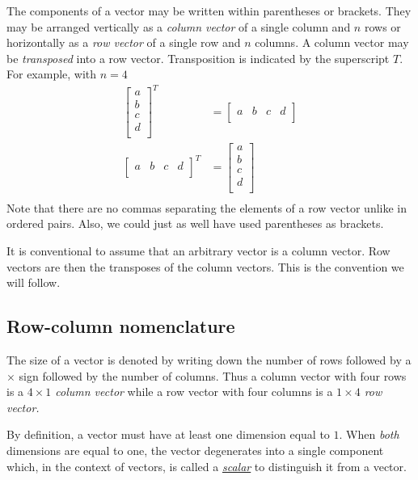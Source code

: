 \documentclass[
  a4paper,
]{article}
\begin{document}
The components of a vector may be written within parentheses or
brackets. They may be arranged vertically as a \emph{column vector} of a
single column and \(n\) rows or horizontally as a \emph{row vector} of a
single row and \(n\) columns. A column vector may be \emph{transposed}
into a row vector. Transposition is indicated by the superscript \(T\).
For example, with \(n = 4\) \[
\begin{aligned}
\begin{bmatrix}a\\b\\c\\d\\\end{bmatrix}^{T} & = \begin{bmatrix}a&b&c&d\\\end{bmatrix}\\
\begin{bmatrix}a&b&c&d\\\end{bmatrix}^{T} & = \begin{bmatrix}a\\b\\c\\d\\\end{bmatrix}\\
\end{aligned}
\] Note that there are no commas separating the elements of a row vector
unlike in ordered pairs. Also, we could just as well have used
parentheses as brackets.

It is conventional to assume that an arbitrary vector is a column
vector. Row vectors are then the transposes of the column vectors. This
is the convention we will follow.

\hypertarget{row-column-nomenclature}{%
\subsection{Row-column nomenclature}\label{row-column-nomenclature}}

The size of a vector is denoted by writing down the number of rows
followed by a \(\times\) sign followed by the number of columns. Thus a
column vector with four rows is a \emph{\(4 \times 1\) column vector}
while a row vector with four columns is a \emph{\(1 \times 4\) row
vector.}

By definition, a vector must have at least one dimension equal to \(1\).
When \emph{both} dimensions are equal to one, the vector degenerates
into a single component which, in the context of vectors, is called a
\href{http://en.wikipedia.org/wiki/Scalar_\%28mathematics\%29}{\emph{scalar}}
to distinguish it from a vector.
\end{document}
